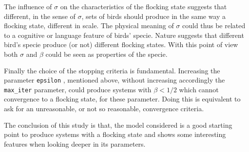 \documentclass{article} %
\newcounter{late}
\begin{document}
The influence of $\sigma$ on the 
characteristics of the flocking state suggests that different, in the sense of $\sigma$, sets 
of birds should produce in the same way a flocking state, different in scale. The physical meaning of $\sigma$
could thus be related to a cognitive or language feature of birds' specie. 
Nature suggests that different bird's specie produce (or not) different flocking states. With this
point of view both $\sigma$ and $\beta$ could be seen as properties of the specie.

Finally the choice of the stopping criteria is fundamental. Increasing the parameter \verb|epsilon| ,
mentioned above, without increasing accordingly the \verb|max_iter| parameter, could produce 
systems with $\beta<1/2$ which cannot convergence to a flocking state, for these parameter.
Doing this is equivalent to ask for an unreasonable, or not so reasonable, convergence criteria.

The conclusion of this study is that, the model considered is a good starting point to produce 
systems with a flocking state and shows some interesting features when looking deeper in its parameters.
\end{document}
